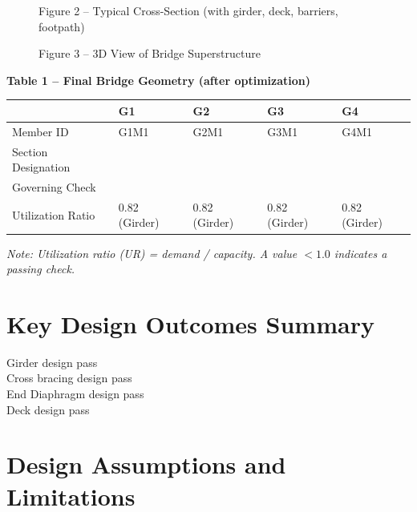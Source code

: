 \documentclass[12pt,a4paper]{report}
\numberwithin{table}{chapter}
\numberwithin{figure}{chapter}
\begin{document}
\newpage

\begin{figure}[H]
\centering
{}
\caption*{Figure 2 -- Typical Cross-Section (with girder, deck, barriers, footpath)}
\end{figure}

\begin{figure}[H]
\centering
{}
\caption*{Figure 3 -- 3D View of Bridge Superstructure}
\end{figure}

\noindent\textbf{Table 1 -- Final Bridge Geometry (after optimization)}

\vspace{0.4em}
\noindent
\begin{tabular}{|C{2.8cm}|C{3.0cm}|C{3.0cm}|C{3.0cm}|C{3.0cm}|}
\hline
  \textbf{} &
  \textbf{G1} &
  \textbf{G2} &
  \textbf{G3} &
  \textbf{G4} \\
\hline
Member ID & G1M1 & G2M1 & G3M1 & G4M1 \\
\hline
Section Designation &  &  &  &  \\
\hline
Governing Check &  &  &  &  \\
\hline
Utilization Ratio & 0.82 (Girder) & 0.82 (Girder) & 0.82 (Girder) & 0.82 (Girder) \\
\hline
\end{tabular}

\vspace{0.4em}
\noindent\textit{Note: Utilization ratio (UR) = demand / capacity. A value $< 1.0$ indicates a passing check.}

\vspace{1em}

\section*{Key Design Outcomes Summary}
\label{sec:key-outcomes}

\noindent Girder design pass \\
Cross bracing design pass \\
End Diaphragm design pass \\
Deck design pass

\section*{Design Assumptions and Limitations}
\label{sec:assumptions}
\end{document}
